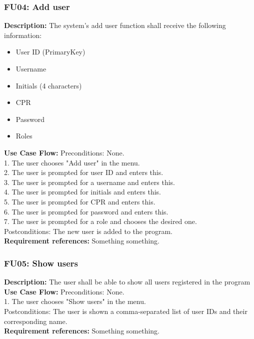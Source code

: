 \begin{adjustwidth}{2em}{0pt}
    \subsubsection*{FU04: Add user}
    \begin{adjustwidth}{1em}{0pt}
        \textbf{Description:}
        The system's add user function shall receive the following information:
        \begin{multicols}{2}
            \begin{itemize}
                \item User ID (PrimaryKey)
                \item Username
                \item Initials (4 characters)
                \item CPR
                \item Password
                \item Roles
            \end{itemize}
        \end{multicols}
        \textbf{Use Case Flow:}
        Preconditions: None.\\
        1. The user chooses "Add user" in the menu.\\
        2. The user is prompted for user ID and enters this.\\
        3. The user is prompted for a username and enters this.\\
        4. The user is prompted for initials and enters this.\\
        5. The user is prompted for CPR and enters this.\\
        6. The user is prompted for password and enters this.\\
        7. The user is prompted for a role and chooses the desired one.\\
        Postconditions: The new user is added to the program.\\
        \textbf{Requirement references:}
        Something something.
    \end{adjustwidth}
    
    \subsubsection*{FU05: Show users}
    \begin{adjustwidth}{1em}{0pt}
        \textbf{Description:}
        The user shall be able to show all users registered in the program\\
        \textbf{Use Case Flow:}
        Preconditions: None.\\
        1. The user chooses "Show users" in the menu.\\
        Postconditions: The user is shown a comma-separated list of user IDs and their corresponding name.\\
        \textbf{Requirement references:}
        Something something.
    \end{adjustwidth}
    

\end{adjustwidth}
